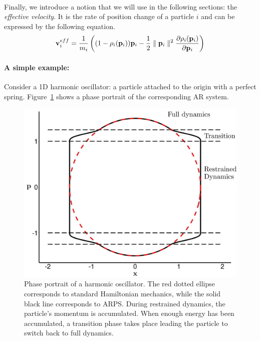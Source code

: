 \paragraph*{}
Finally, we introduce a notion that we will use in the following sections: the \textit{effective velocity}. It is the rate of position change of a particle $i$ and can be expressed by the following equation.
\begin{equation}
    \label{eq:adaptiveVelocity}
    \mathbf{v}_{i}^{eff} = \frac{1}{m_{i}} \left( (1-\rho_{i}(\mathbf{p}_{i}))\mathbf{p}_{i} - \frac{1}{2} \parallel \mathbf{p}_{i} \parallel^2 \frac{\partial \rho_{i}(\mathbf{p}_{i})}{\partial \mathbf{p}_{i}}\right)
\end{equation}

\paragraph*{A simple example:}
Consider a 1D harmonic oscillator: a particle attached to the origin with a perfect spring.
Figure~\ref{fig:harmonicOscillatorPhasePortrait} shows a phase portrait of the corresponding
AR system.

\begin{figure}[!h]
	\centering
	\includegraphics[width=0.8\linewidth]{images/arps-vriphys2013/harmonicOscillatorPhasePortraitraw_hacked.png}
	\caption[ARPS: Phase portrait of a ARPS harmonic oscillator]{\label{fig:harmonicOscillatorPhasePortrait} Phase portrait of a harmonic oscillator. The red dotted ellipse corresponds to standard Hamiltonian mechanics, while the solid black line corresponds to ARPS. During restrained dynamics, the particle's momentum is accumulated. When enough energy has been accumulated, a transition phase takes place leading the particle to switch back to full dynamics.}
\end{figure}

